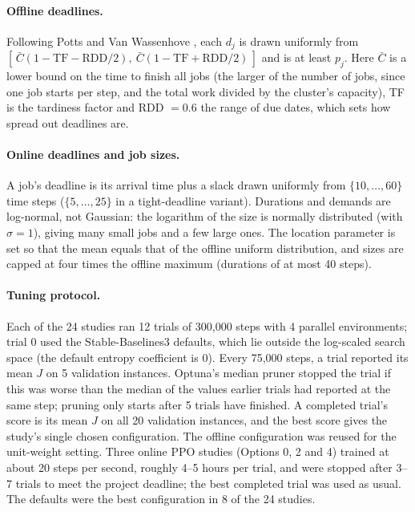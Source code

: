 \documentclass[12pt]{article}
\begin{document}
\paragraph{Offline deadlines.} Following Potts and Van Wassenhove \cite{potts1985wtardiness}, each $d_j$ is drawn uniformly from $[\,\bar{C}(1 - \mathrm{TF} - \mathrm{RDD}/2),\ \bar{C}(1 - \mathrm{TF} + \mathrm{RDD}/2)\,]$ and is at least $p_j$. Here $\bar{C}$ is a lower bound on the time to finish all jobs (the larger of the number of jobs, since one job starts per step, and the total work divided by the cluster's capacity), TF is the tardiness factor and RDD $= 0.6$ the range of due dates, which sets how spread out deadlines are.

\paragraph{Online deadlines and job sizes.} A job's deadline is its arrival time plus a slack drawn uniformly from $\{10, \dots, 60\}$ time steps ($\{5, \dots, 25\}$ in a tight-deadline variant). Durations and demands are log-normal, not Gaussian: the logarithm of the size is normally distributed (with $\sigma = 1$), giving many small jobs and a few large ones. The location parameter is set so that the mean equals that of the offline uniform distribution, and sizes are capped at four times the offline maximum (durations of at most 40 steps).

\paragraph{Tuning protocol.} Each of the 24 studies ran 12 trials of 300,000 steps with 4 parallel environments; trial 0 used the Stable-Baselines3 defaults, which lie outside the log-scaled search space (the default entropy coefficient is 0). Every 75,000 steps, a trial reported its mean $J$ on 5 validation instances. Optuna's median pruner stopped the trial if this was worse than the median of the values earlier trials had reported at the same step; pruning only starts after 5 trials have finished. A completed trial's score is its mean $J$ on all 20 validation instances, and the best score gives the study's single chosen configuration. The offline configuration was reused for the unit-weight setting. Three online PPO studies (Options 0, 2 and 4) trained at about 20 steps per second, roughly 4--5 hours per trial, and were stopped after 3--7 trials to meet the project deadline; the best completed trial was used as usual. The defaults were the best configuration in 8 of the 24 studies.
\end{document}
